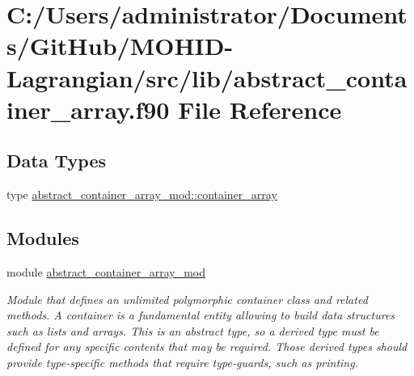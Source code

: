 \hypertarget{abstract__container__array_8f90}{}\section{C\+:/\+Users/administrator/\+Documents/\+Git\+Hub/\+M\+O\+H\+I\+D-\/\+Lagrangian/src/lib/abstract\+\_\+container\+\_\+array.f90 File Reference}
\label{abstract__container__array_8f90}
\subsection*{Data Types}
\begin{DoxyCompactItemize}
\item 
type \hyperlink{structabstract__container__array__mod_1_1container__array}{abstract\+\_\+container\+\_\+array\+\_\+mod\+::container\+\_\+array}
\end{DoxyCompactItemize}
\subsection*{Modules}
\begin{DoxyCompactItemize}
\item 
module \hyperlink{namespaceabstract__container__array__mod}{abstract\+\_\+container\+\_\+array\+\_\+mod}
\begin{DoxyCompactList}\small\item\em Module that defines an unlimited polymorphic container class and related methods. A container is a fundamental entity allowing to build data structures such as lists and arrays. This is an abstract type, so a derived type must be defined for any specific contents that may be required. Those derived types should provide type-\/specific methods that require type-\/guards, such as printing. \end{DoxyCompactList}\end{DoxyCompactItemize}
